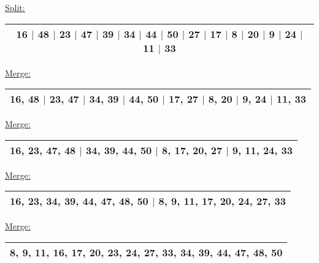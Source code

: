 {{\underline{Split:}
    \begin{center}
       \color{tumgadRed}        \begin{tabular}{|c|}
            \hline
16 $|$ 48 $|$ 23 $|$ 47 $|$ 39 $|$ 34 $|$ 44 $|$ 50 $|$ 27 $|$ 17 $|$ 8 $|$ 20 $|$ 9 $|$ 24 $|$ 11 $|$ 33\\
            \hline
        \end{tabular}
        \vspace{10px}
    \end{center}

\underline{Merge:}
    \begin{center}
       \color{tumgadRed}        \begin{tabular}{|c|}
            \hline
16, 48 $|$ 23, 47 $|$ 34, 39 $|$ 44, 50 $|$ 17, 27 $|$ 8, 20 $|$ 9, 24 $|$ 11, 33
\\
            \hline
        \end{tabular}
        \vspace{10px}
    \end{center}

\underline{Merge:}
    \begin{center}
       \color{tumgadRed}        \begin{tabular}{|c|}
            \hline
16, 23, 47, 48 $|$ 34, 39, 44, 50 $|$ 8, 17, 20, 27 $|$ 9, 11, 24, 33
\\
            \hline
        \end{tabular}
        \vspace{10px}
    \end{center}

\underline{Merge:}
    \begin{center}
       \color{tumgadRed}        \begin{tabular}{|c|}
            \hline
16, 23, 34, 39, 44, 47, 48, 50 $|$ 8, 9, 11, 17, 20, 24, 27, 33
\\
            \hline
        \end{tabular}
        \vspace{10px}
    \end{center}

\underline{Merge:}
    \begin{center}
       \color{tumgadRed}        \begin{tabular}{|c|}
            \hline
8, 9, 11, 16, 17, 20, 23, 24, 27, 33, 34, 39, 44, 47, 48, 50
\\
            \hline
        \end{tabular}
        \vspace{10px}
    \end{center}
            \vspace{10px}
        }
    }
